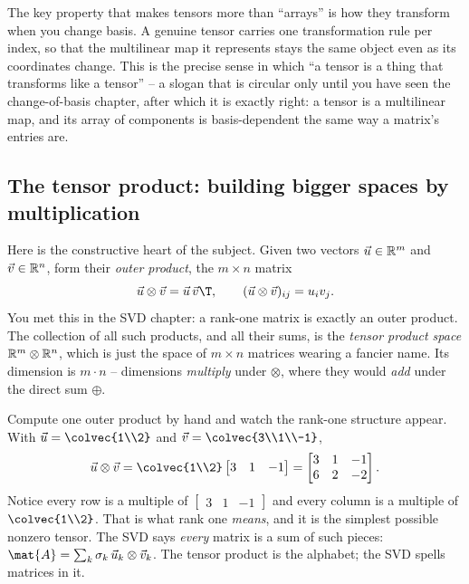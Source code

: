 The key property that makes tensors more than ``arrays'' is how they transform when
you change basis. A genuine tensor carries one transformation rule per index, so
that the multilinear map it represents stays the same object even as its
coordinates change. This is the precise sense in which ``a tensor is a thing that
transforms like a tensor'' -- a slogan that is circular only until you have seen the
change-of-basis chapter, after which it is exactly right: a tensor is a multilinear
map, and its array of components is basis-dependent the same way a matrix's entries
are.

\subsection{The tensor product: building bigger spaces by multiplication}
\label{ch37:tensorproduct}

Here is the constructive heart of the subject. Given two vectors $\vec{u}\in\mathbb{R}^m$
and $\vec{v}\in\mathbb{R}^n$, form their \emph{outer product}, the $m\times n$ matrix
\[
  \vec{u}\otimes\vec{v} = \vec{u}\,\vec{v}\T,
  \qquad (\vec{u}\otimes\vec{v})_{ij} = u_i v_j.
\]
You met this in the SVD chapter: a rank-one matrix is exactly an outer product. The
collection of all such products, and all their sums, is the \emph{tensor product
space} $\mathbb{R}^m\otimes\mathbb{R}^n$, which is just the space of $m\times n$ matrices wearing a
fancier name. Its dimension is $m\cdot n$ -- dimensions \emph{multiply} under
$\otimes$, where they would \emph{add} under the direct sum $\oplus$.

\begin{labbox}
Compute one outer product by hand and watch the rank-one structure appear. With
$\vec{u}=\colvec{1\\2}$ and $\vec{v}=\colvec{3\\1\\-1}$,
\[
  \vec{u}\otimes\vec{v} = \colvec{1\\2}\begin{bmatrix}3&1&-1\end{bmatrix}
  = \begin{bmatrix}3&1&-1\\ 6&2&-2\end{bmatrix}.
\]
Notice every row is a multiple of $\begin{bmatrix}3&1&-1\end{bmatrix}$ and every
column is a multiple of $\colvec{1\\2}$. That is what rank one \emph{means}, and it
is the simplest possible nonzero tensor. The SVD says \emph{every} matrix is a sum
of such pieces: $\mat{A}=\sum_k \sigma_k\,\vec{u}_k\otimes\vec{v}_k$. The tensor
product is the alphabet; the SVD spells matrices in it.
\end{labbox}

